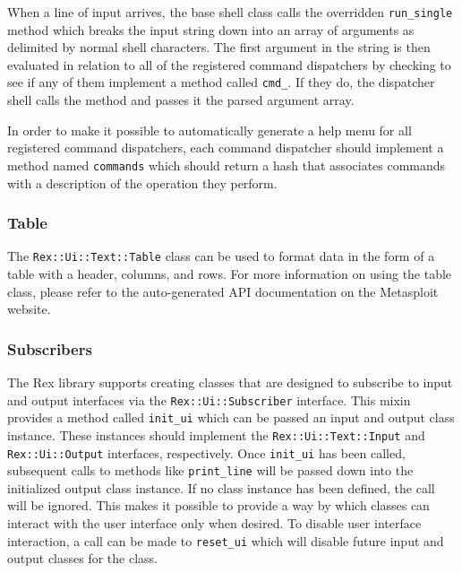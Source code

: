 \documentclass{report}
\begin{document}
\par
When a line of input arrives, the base shell class calls the
overridden \texttt{run\_single} method which breaks the input string
down into an array of arguments as delimited by normal shell
characters.  The first argument in the string is then evaluated in
relation to all of the registered command dispatchers by checking to
see if any of them implement a method called \texttt{cmd\_<arg 0>}.
If they do, the dispatcher shell calls the method and passes it the
parsed argument array.

\par
In order to make it possible to automatically generate a help menu
for all registered command dispatchers, each command dispatcher
should implement a method named \texttt{commands} which should
return a hash that associates commands with a description of the
operation they perform.

            \subsubsection{Table}

\par
The \texttt{Rex::Ui::Text::Table} class can be used to format data
in the form of a table with a header, columns, and rows.  For more
information on using the table class, please refer to the
auto-generated API documentation on the Metasploit website.

            \subsubsection{Subscribers}

\par
The Rex library supports creating classes that are designed to
subscribe to input and output interfaces via the
\texttt{Rex::Ui::Subscriber} interface.  This mixin provides a
method called \texttt{init\_ui} which can be passed an input and
output class instance.  These instances should implement the
\texttt{Rex::Ui::Text::Input} and \texttt{Rex::Ui::Output}
interfaces, respectively.  Once \texttt{init\_ui} has been called,
subsequent calls to methods like \texttt{print\_line} will be passed
down into the initialized output class instance.  If no class
instance has been defined, the call will be ignored.  This makes it
possible to provide a way by which classes can interact with the
user interface only when desired.  To disable user interface
interaction, a call can be made to \texttt{reset\_ui} which will
disable future input and output classes for the class.
\end{document}
